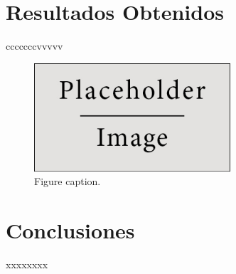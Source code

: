 \documentclass{article}
\begin{document}

\section{Resultados Obtenidos}
cccccccvvvvv

\begin{figure}[h]
\begin{center}
\includegraphics[width=0.65\textwidth]{placeholder} %
\caption{Figure caption.}
\end{center}
\end{figure}


\section{Conclusiones}

xxxxxxxx

\end{document}
